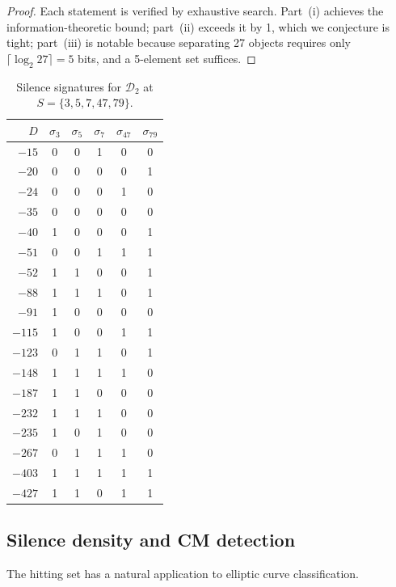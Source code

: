 \documentclass[11pt]{amsart}
\theoremstyle{definition}
\begin{document}
\begin{proof}
Each statement is verified by exhaustive search. Part~(i) achieves the information-theoretic bound; part~(ii) exceeds it by 1, which we conjecture is tight; part~(iii) is notable because separating 27 objects requires only $\lceil \log_2 27 \rceil = 5$ bits, and a 5-element set suffices.\qedhere
\end{proof}

\begin{table}[ht]
\centering
\caption{Silence signatures for $\mathcal{D}_2$ at $S = \{3, 5, 7, 47, 79\}$.}
\label{tab:h2signatures}
\begin{tabular}{r ccccc}
\toprule
$D$ & $\sigma_3$ & $\sigma_5$ & $\sigma_7$ & $\sigma_{47}$ & $\sigma_{79}$ \\
\midrule
$-15$ & 0 & 0 & 1 & 0 & 0 \\
$-20$ & 0 & 0 & 0 & 0 & 1 \\
$-24$ & 0 & 0 & 0 & 1 & 0 \\
$-35$ & 0 & 0 & 0 & 0 & 0 \\
$-40$ & 1 & 0 & 0 & 0 & 1 \\
$-51$ & 0 & 0 & 1 & 1 & 1 \\
$-52$ & 1 & 1 & 0 & 0 & 1 \\
$-88$ & 1 & 1 & 1 & 0 & 1 \\
$-91$ & 1 & 0 & 0 & 0 & 0 \\
$-115$ & 1 & 0 & 0 & 1 & 1 \\
$-123$ & 0 & 1 & 1 & 0 & 1 \\
$-148$ & 1 & 1 & 1 & 1 & 0 \\
$-187$ & 1 & 1 & 0 & 0 & 0 \\
$-232$ & 1 & 1 & 1 & 0 & 0 \\
$-235$ & 1 & 0 & 1 & 0 & 0 \\
$-267$ & 0 & 1 & 1 & 1 & 0 \\
$-403$ & 1 & 1 & 1 & 1 & 1 \\
$-427$ & 1 & 1 & 0 & 1 & 1 \\
\bottomrule
\end{tabular}
\end{table}

\subsection{Silence density and CM detection}

The hitting set has a natural application to elliptic curve classification.
\end{document}
